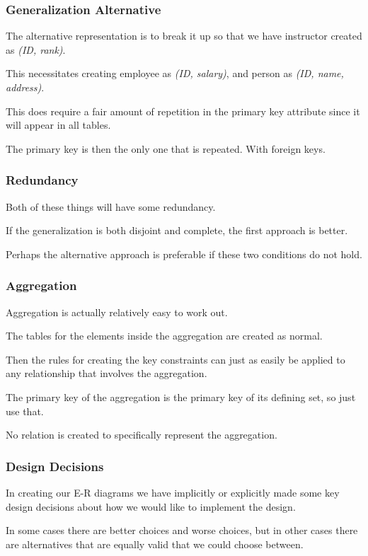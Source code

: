 \begin{frame}
\frametitle{Generalization Alternative}

The alternative representation is to break it up so that we have instructor created as \textit{(ID, rank)}.

This necessitates creating employee as \textit{(ID, salary)}, and person as \textit{(ID, name, address)}. 

This does require a fair amount of repetition in the primary key attribute since it will appear in all tables. 

The primary key is then the only one that is repeated. With foreign keys.


\end{frame}



\begin{frame}
\frametitle{Redundancy}

Both of these things will have some redundancy. 

If the generalization is both disjoint and complete, the first approach is better.

Perhaps the alternative approach is preferable if these two conditions do not hold.

\end{frame}



\begin{frame}
\frametitle{Aggregation}

Aggregation is actually relatively easy to work out. 

The tables for the elements inside the aggregation are created as normal. 

Then the rules for creating the key constraints can just as easily be applied to any relationship that involves the aggregation. 

The primary key of the aggregation is the primary key of its defining set, so just use that. 

No relation is created to specifically represent the aggregation.

\end{frame}



\begin{frame}
\frametitle{Design Decisions}

In creating our E-R diagrams we have implicitly or explicitly made some key design decisions about how we would like to implement the design. 

In some cases there are better choices and worse choices, but in other cases there are alternatives that are equally valid that we could choose between.

\end{frame}



